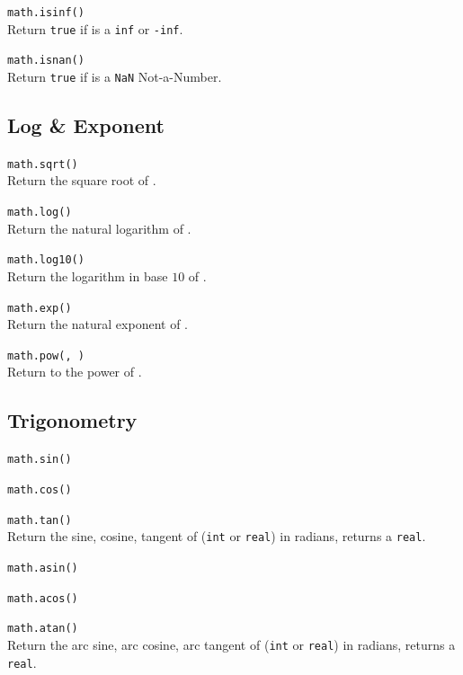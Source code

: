 \hangpar \texttt{math.isinf(}\texttt{)} \\
Return \texttt{true} if  is a \texttt{inf} or \texttt{-inf}.

\hangpar \texttt{math.isnan(}\texttt{)} \\
Return \texttt{true} if  is a \texttt{NaN} Not-a-Number.

\subsection*{Log \& Exponent}

\hangpar \texttt{math.sqrt(}\texttt{)}\\
Return the square root of .

\hangpar \texttt{math.log(}\texttt{)}\\
Return the natural logarithm of .

\hangpar \texttt{math.log10(}\texttt{)}\\
Return the logarithm in base $10$ of .

\hangpar \texttt{math.exp(}\texttt{)}\\
Return the natural exponent of .

\hangpar \texttt{math.pow(}\texttt{, }\texttt{)}\\
Return  to the power of .


\subsection*{Trigonometry}

\hangpar \texttt{math.sin(}\texttt{)}

\hangpar \texttt{math.cos(}\texttt{)}

\hangpar \texttt{math.tan(}\texttt{)}\\
Return the sine, cosine, tangent of  (\texttt{int} or \texttt{real}) in radians, returns a \texttt{real}.

\hangpar \texttt{math.asin(}\texttt{)}

\hangpar \texttt{math.acos(}\texttt{)}

\hangpar \texttt{math.atan(}\texttt{)}\\
Return the arc sine, arc cosine, arc tangent of  (\texttt{int} or \texttt{real}) in radians, returns a \texttt{real}.

